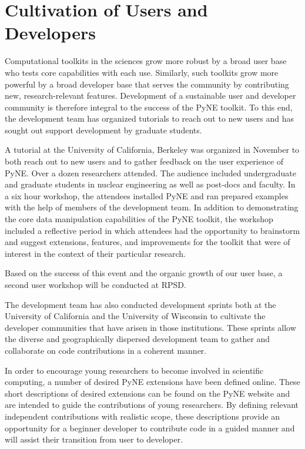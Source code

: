 \documentclass{anstrans}
\begin{document}
\section{Cultivation of Users and Developers} 
Computational toolkits in the sciences grow more robust by a broad user base 
who tests core capabilities with each use. Similarly, such toolkits grow more 
powerful by a broad developer base that serves the community by contributing 
new, research-relevant features. Development of a sustainable user and 
developer community is therefore integral to the success of the PyNE toolkit. 
To this end, the development team has organized tutorials to reach out to new 
users and has sought out support development by graduate students.

A tutorial at the University of California, Berkeley was organized in November 
to both reach out to new users and to gather feedback on the user experience of 
PyNE. Over a dozen researchers attended. The audience included undergraduate 
and graduate students in nuclear engineering as well as post-docs and faculty. 
In a six hour workshop, the attendees installed PyNE and ran prepared examples 
with the help of members of the development team. In addition to demonstrating 
the core data manipulation capabilities of the PyNE toolkit, the workshop 
included a reflective period in which attendees had the opportunity to 
brainstorm and suggest extensions, features, and improvements for the toolkit 
that were of interest in the context of their particular research.

Based on the success of this event and the organic growth of our user base, a 
second user workshop will be conducted at RPSD.

The development team has also conducted development sprints both at the 
University of California and the University of Wisconsin to cultivate the 
developer communities that have arisen in those institutions. These sprints 
allow the diverse and geographically dispersed development team to gather and 
collaborate on code contributions in a coherent manner.

In order to encourage young researchers to become involved in scientific 
computing, a number of desired PyNE extensions have been defined online. These 
short descriptions of desired extensions can be found on the PyNE website and 
are intended to guide the contributions of young researchers. By defining 
relevant independent contributions with realistic scope, these descriptions 
provide an opportunity for a beginner developer to contribute code in a guided 
manner and will assist their transition from user to developer.
\end{document}
